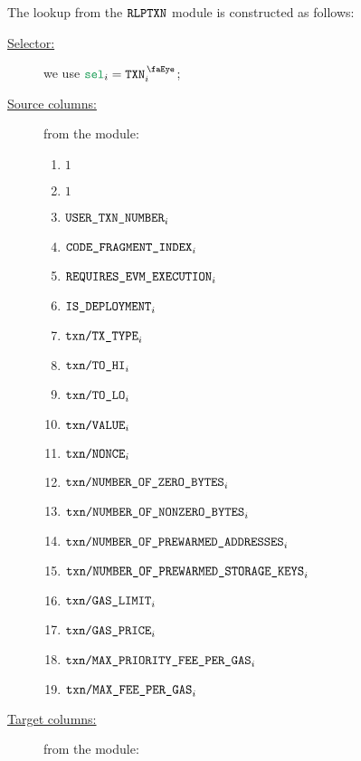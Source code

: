 The lookup from the $\texttt{RLPTXN}$ module is constructed as follows:
\begin{description}
	\item[\underline{Selector:}] we use $\loc{sel} _{i} = \isTxn _{i}$;
	\item[\underline{Source columns:}] from the \rlpTxnMod{} module:
		\begin{multicols}{2}
			\begin{enumerate}
				\item $1$
				\item $1$
				\item $\texttt{USER}\texttt{\_}\texttt{TXN\_NUMBER}                       _{i}$
				\item $\texttt{CODE\_FRAGMENT\_INDEX}                                         _{i}$
				\item $\texttt{REQUIRES\_EVM\_EXECUTION}      _{i}$
				\item $\texttt{IS\_DEPLOYMENT}                     _{i}$
				\item $\texttt{txn}\texttt{/}\texttt{{TX\_TYPE}}               _{i}$
				\item $\texttt{txn}\texttt{/}\texttt{{TO\_HI}}                 _{i}$
				\item $\texttt{txn}\texttt{/}\texttt{{TO\_LO}}                 _{i}$
				\item $\texttt{txn}\texttt{/}\texttt{{VALUE}}             _{i}$
				\item $\texttt{txn}\texttt{/}\texttt{{\texttt{NONCE}}}                _{i}$
				\item $\texttt{txn}\texttt{/}\texttt{{NUMBER\_OF\_ZERO\_BYTES}}         _{i}$
				\item $\texttt{txn}\texttt{/}\texttt{{NUMBER\_OF\_NONZERO\_BYTES}}      _{i}$
				\item $\texttt{txn}\texttt{/}\texttt{{NUMBER\_OF\_PREWARMED\_ADDRESSES}}      _{i}$
				\item $\texttt{txn}\texttt{/}\texttt{{NUMBER\_OF\_PREWARMED\_STORAGE\_KEYS}}   _{i}$
				\item $\texttt{txn}\texttt{/}\texttt{{GAS\_LIMIT}}             _{i}$
				\item $\texttt{txn}\texttt{/}\texttt{{GAS\_PRICE}}             _{i}$
				\item $\texttt{txn}\texttt{/}\texttt{{MAX\_PRIORITY\_FEE\_PER\_GAS}} _{i}$
				\item $\texttt{txn}\texttt{/}\texttt{{MAX\_FEE\_PER\_GAS}}         _{i}$
			\end{enumerate}
		\end{multicols}
	\item[\underline{Target columns:}] from the \userTxnDataMod{} module: 
		\begin{multicols}{2}

\end{multicols}
\end{description}

